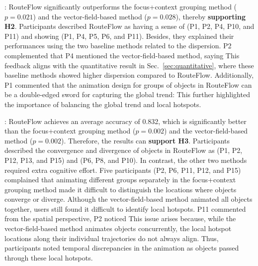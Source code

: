 \trend:
RouteFlow significantly outperforms the focus+context grouping method ($p = 0.021$) and the vector-field-based method ($p=0.028$), thereby \textbf{supporting H2}.
Participants described RouteFlow as having a sense of  (P1, P2, P4, P10, and P11) and showing  (P1, P4, P5, P6, and P11).
Besides, they explained their performances using the two baseline methods related to the dispersion. 
P2 complemented that 
P4 mentioned the vector-field-based method, saying 
This feedback aligns with the quantitative result in Sec.~\ref{sec:quantitative}, where these baseline methods showed higher dispersion compared to RouteFlow.
Additionally, P1 commented that the animation design for groups of objects in RouteFlow can be a double-edged sword for capturing the global trend: 
This further highlighted the importance of balancing the global trend and local hotspots.

\hotspot:
RouteFlow achieves an average accuracy of 0.832, which is significantly better than the focus+context grouping method ($p = 0.002$) and the vector-field-based method ($p=0.002$).
Therefore, the results can \textbf{support H3}.
Participants described the convergence and divergence of objects in RouteFlow as  (P1, P2, P12, P13, and P15) and  (P6, P8, and P10).
In contrast, the other two methods required extra cognitive effort.
Five participants (P2, P6, P11, P12, and P15) complained that animating different groups separately in the focus+context grouping method made it difficult to distinguish the locations where objects converge or diverge.
Although the vector-field-based method animated all objects together, users still found it difficult to identify local hotspots.
P11 commented from the spatial perspective, 
P2 noticed 
This issue arises because, while the vector-field-based method animates objects concurrently, the local hotspot locations along their individual trajectories do not always align.
Thus, participants noted temporal discrepancies in the animation as objects passed through these local hotspots.





